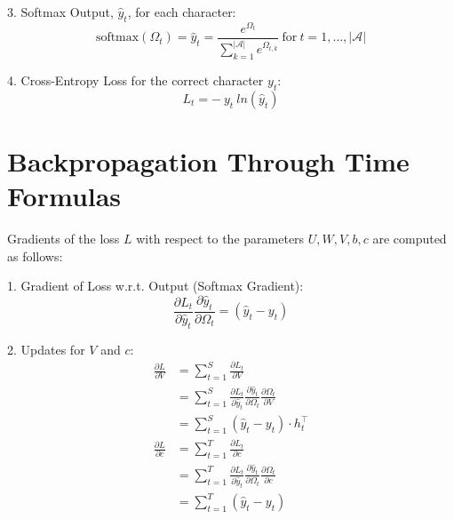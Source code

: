 \documentclass{article}
\begin{document}
3. Softmax Output, $\hat{y}_t$, for each character:
$$
\text{softmax} (\Omega_{t})=\hat{y}_{t}=\frac{e^{\Omega_t}}{\sum_{k=1}^{|\mathcal{A}|} e^{\Omega_{t,k}}} ~\text{for}~ t=1, \ldots, |\mathcal{A}|
$$

4. Cross-Entropy Loss for the correct character $y_{t}$:
$$
L_t = -~y_t~ln(\hat{y}_t)
$$
\section{Backpropagation Through Time Formulas}

Gradients of the loss $L$ with respect to the parameters $U, W, V, b, c$ are computed as follows:

1. Gradient of Loss w.r.t. Output (Softmax Gradient):
$$\label{eqn:partial_aV}
\frac{\partial L_t}{\partial \hat{y}_t}\frac{\partial \hat{y}_t}{\partial \Omega_t} = (\hat{y}_{t}-y_{t})
$$

2. Updates for $V$ and $c$:
\begin{align*} 
\frac{\partial L}{\partial V} &= \sum_{t=1}^{S} \frac{\partial L_{t}}{\partial V} \\
&= \sum_{t=1}^{S} \frac{\partial L_{t}}{\partial \hat{y}_{t}} \frac{\partial \hat{y}_{t}}{\partial \Omega_{t}} \frac{\partial \Omega_{t}}{\partial V}\\
&=\sum_{t=1}^{S} (\hat{y}_{t} - y_{t}) \cdot h_{t}^\top\\
\frac{\partial L}{\partial c} &= \sum_{t=1}^{T} \frac{\partial L_t}{\partial c} \\
&= \sum_{t=1}^{T} \frac{\partial L_{t}}{\partial \hat{y}_{t}} \frac{\partial \hat{y}_{t}}{\partial \Omega_{t}} \frac{\partial \Omega_{t}}{\partial c}\\
 &=\sum_{t=1}^{T} (\hat{y}_{t} - y_{t})
\end{align*}
\end{document}
